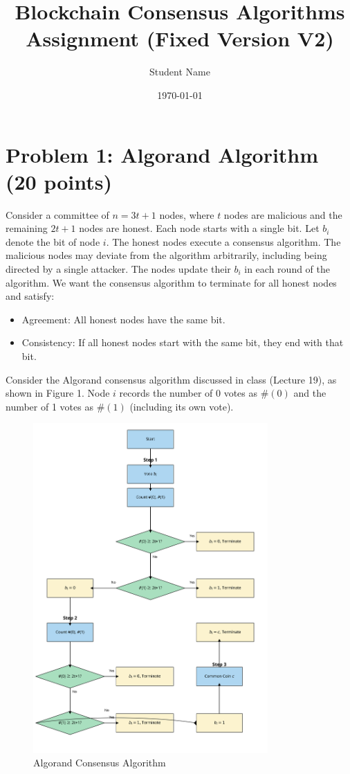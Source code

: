 \documentclass[12pt,a4paper]{article}
\title{Blockchain Consensus Algorithms Assignment (Fixed Version V2)}
\author{Student Name}
\date{\today}
\begin{document}
\maketitle

\section{Problem 1: Algorand Algorithm (20 points)}

Consider a committee of $n = 3t + 1$ nodes, where $t$ nodes are malicious and the remaining $2t + 1$ nodes are honest. Each node starts with a single bit. Let $b_i$ denote the bit of node $i$. The honest nodes execute a consensus algorithm. The malicious nodes may deviate from the algorithm arbitrarily, including being directed by a single attacker. The nodes update their $b_i$ in each round of the algorithm. We want the consensus algorithm to terminate for all honest nodes and satisfy:

\begin{itemize}
    \item Agreement: All honest nodes have the same bit.
    \item Consistency: If all honest nodes start with the same bit, they end with that bit.
\end{itemize}

Consider the Algorand consensus algorithm discussed in class (Lecture 19), as shown in Figure 1. Node $i$ records the number of 0 votes as $\#(0)$ and the number of 1 votes as $\#(1)$ (including its own vote).

\begin{figure}[h]
    \centering
    \includegraphics[width=0.8\textwidth]{images/algorand_algorithm_improved.png}
    \caption{Algorand Consensus Algorithm}
\end{figure}
\end{document}

